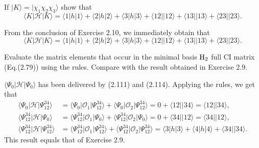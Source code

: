 \documentclass[a4paper]{book}
\newcounter{exercise}[chapter]
\newcounter{solution}[chapter]
\begin{document}
	\begin{exercise}
	If $|K\rangle = |\chi_1 \chi_2 \chi_3 \rangle$ show that
	\[
		\langle K | \mathscr{H} | K \rangle = \langle 1 | h | 1 \rangle + \langle 2 | h | 2 \rangle + \langle 3 | h | 3 \rangle + \langle 12 || 12 \rangle + \langle 13 || 13 \rangle + \langle 23 || 23 \rangle .
	\]
	\end{exercise}
	
	\begin{solution}
	
	From the conclusion of Exercise 2.10, we immediately obtain that
	\[
		\langle K | \mathscr{H} | K \rangle = \langle 1 | h | 1 \rangle + \langle 2 | h | 2 \rangle + \langle 3 | h | 3 \rangle + \langle 12 || 12 \rangle + \langle 13 || 13 \rangle + \langle 23 || 23 \rangle .
	\]
	
	\end{solution}
	
	\begin{exercise}
	Evaluate the matrix elements that occur in the minimal basis $\ce{H2}$ full CI matrix (Eq.(2.79)) using the rules. Compare with the result obtained in Exercise 2.9.
	\end{exercise}
	
	\begin{solution}
	
	$\langle \Psi_0 | \mathscr{H} | \Psi_0 \rangle$ has been delivered by (2.111) and (2.114). Applying the rules, we get that
	\begin{align*}
		\langle \Psi_0 | \mathscr{H} | \Psi^{34}_{12} \rangle &= \langle \Psi_0 | \mathscr{O}_1 | \Psi^{34}_{12} \rangle + \langle \Psi_0 | \mathscr{O}_2 | \Psi^{34}_{12} \rangle = 0 + \langle 12 || 34 \rangle = \langle 12 || 34 \rangle , \\
		\langle \Psi^{34}_{12} | \mathscr{H} | \Psi_0 \rangle &= \langle \Psi^{34}_{12} | \mathscr{O}_1 | \Psi_0 \rangle + \langle \Psi^{34}_{12} | \mathscr{O}_2 | \Psi_0 \rangle = 0 + \langle 34 || 12 \rangle = \langle 34 || 12 \rangle , \\
		\langle \Psi^{34}_{12} | \mathscr{H} | \Psi^{34}_{12} \rangle &= \langle \Psi^{34}_{12} | \mathscr{O}_1 | \Psi^{34}_{12} \rangle + \langle \Psi^{34}_{12} | \mathscr{O}_2 | \Psi^{34}_{12} \rangle = \langle 3 | h | 3 \rangle + \langle 4 | h | 4 \rangle + \langle 34 || 34 \rangle .
	\end{align*}
	This result equals that of Exercise 2.9.
	
	\end{solution}
	
\end{document}
